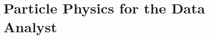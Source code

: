 \chapter{Particle Physics for the Data Analyst}\label{ch:T4}

\providecommand{\tfouraR}[2]{\num[round-mode=places,round-precision=#1]{#2}}
\providecommand{\tfouraN}[1]{\num{#1}}

\providecommand{\TfWinNom}{}\renewcommand{\TfWinNom}{75.53}
\providecommand{\TfWinResUp}{}\renewcommand{\TfWinResUp}{69.61}
\providecommand{\TfWinResDn}{}\renewcommand{\TfWinResDn}{81.82}
\providecommand{\TfWinShift}{}\renewcommand{\TfWinShift}{74.33}
\providecommand{\TfShiftGeV}{}\renewcommand{\TfShiftGeV}{0.375}
\providecommand{\TfNdecay}{}\renewcommand{\TfNdecay}{200000}
\providecommand{\TfMaxDev}{}\renewcommand{\TfMaxDev}{2.211\times10^{-11}}
\providecommand{\TfElo}{}\renewcommand{\TfElo}{36.38}
\providecommand{\TfEhi}{}\renewcommand{\TfEhi}{660.5}
\providecommand{\TfAeta}{}\renewcommand{\TfAeta}{0.6313}
\providecommand{\TfAall}{}\renewcommand{\TfAall}{0.5514}
\providecommand{\TfAerr}{}\renewcommand{\TfAerr}{0.001112}
\providecommand{\TfSigMeas}{}\renewcommand{\TfSigMeas}{1.17}
\providecommand{\TfSigPred}{}\renewcommand{\TfSigPred}{1.169}
\providecommand{\TfSigEff}{}\renewcommand{\TfSigEff}{1.154}
\providecommand{\TfRtyp}{}\renewcommand{\TfRtyp}{1.446}
\providecommand{\TfRtypM}{}\renewcommand{\TfRtypM}{1.022}
\providecommand{\TfFwBZ}{}\renewcommand{\TfFwBZ}{2.495}
\providecommand{\TfFwGZ}{}\renewcommand{\TfFwGZ}{3.532}
\providecommand{\TfFwVZ}{}\renewcommand{\TfFwVZ}{5.052}
\providecommand{\TfFwVH}{}\renewcommand{\TfFwVH}{3.77}
\providecommand{\TfFwGH}{}\renewcommand{\TfFwGH}{3.768}
\providecommand{\TfVHrel}{}\renewcommand{\TfVHrel}{0.001021}
\providecommand{\TfAcb}{}\renewcommand{\TfAcb}{133.6}
\providecommand{\TfBcb}{}\renewcommand{\TfBcb}{1.833}
\providecommand{\TfTailFrac}{}\renewcommand{\TfTailFrac}{10.37}
\providecommand{\TfFwCB}{}\renewcommand{\TfFwCB}{2.355}
\providecommand{\TfdNfiles}{}\renewcommand{\TfdNfiles}{4}
\providecommand{\TfdNtot}{}\renewcommand{\TfdNtot}{7798424}
\providecommand{\TfdNsel}{}\renewcommand{\TfdNsel}{151767}
\providecommand{\TfdPtA}{}\renewcommand{\TfdPtA}{176.1}
\providecommand{\TfdPtB}{}\renewcommand{\TfdPtB}{39.63}
\providecommand{\TfdEtaA}{}\renewcommand{\TfdEtaA}{-0.8335}
\providecommand{\TfdEtaB}{}\renewcommand{\TfdEtaB}{0.0947}
\providecommand{\TfdPhiA}{}\renewcommand{\TfdPhiA}{-0.2942}
\providecommand{\TfdPhiB}{}\renewcommand{\TfdPhiB}{0.5673}
\providecommand{\TfdEA}{}\renewcommand{\TfdEA}{240.9}
\providecommand{\TfdEB}{}\renewcommand{\TfdEB}{39.81}
